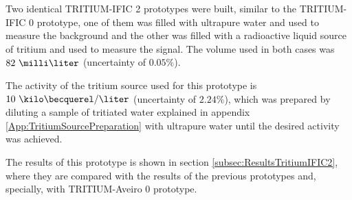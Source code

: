 Two identical TRITIUM-IFIC 2 prototypes were built, similar to the TRITIUM-IFIC 0 prototype, one of them was filled with ultrapure water and used to measure the background and the other was filled with a radioactive liquid source of tritium and used to measure the signal. The volume used in both cases was $82~\milli\liter$ (uncertainty of $0.05\%$).

The activity of the tritium source used for this prototype is $10~\kilo\becquerel/\liter$ (uncertainty of $2.24\%$), which was prepared by diluting a sample of tritiated water explained in appendix \ref{App:TritiumSourcePreparation} with ultrapure water until the desired activity was achieved.

The results of this prototype is shown in section \ref{subsec:ResultsTritiumIFIC2}, where they are compared with the results of the previous prototypes and, specially, with TRITIUM-Aveiro 0 prototype.